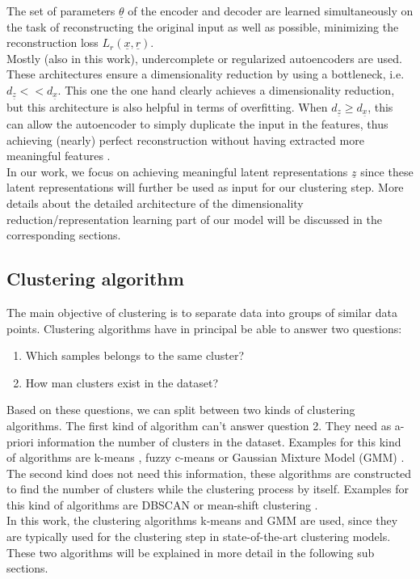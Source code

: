 \documentclass[12pt,DIV14,BCOR12mm,a4paper,footexclude,headinclude,halfparskip-,twoside,openright,cleardoubleempty,idxtotoc,bibtotoc,listtotoc]{scrreprt} %
\numberwithin{equation}{chapter}
\begin{document}
The set of parameters $\underline{\theta}$ of the encoder and decoder are learned simultaneously on the task of reconstructing the original input as well as possible, minimizing the reconstruction loss $L_{r}(\underline{x},\underline{r})$.\\
Mostly (also in this work), undercomplete or regularized autoencoders are used. These architectures ensure a dimensionality reduction by using a bottleneck, i.e. $d_{\underline{z}} << d_{\underline{x}}$. This one the one hand clearly achieves a dimensionality reduction, but this architecture is also helpful in terms of overfitting. When $d_{\underline{z}} \geq d_{\underline{x}}$, this can allow the autoencoder to simply duplicate the input in the features, thus achieving (nearly) perfect reconstruction without having extracted more meaningful features \cite{Bengio-et-al-2013}.\\
In our work, we focus on achieving meaningful latent representations $\underline{z}$ since these latent representations will further be used as input for our clustering step. More details about the detailed architecture of the dimensionality reduction/representation learning part of our model will be discussed in the corresponding sections.
\subsection{Clustering algorithm}
The main objective of clustering is to separate data into groups of similar data points. Clustering algorithms have in principal be able to answer two questions:
\begin{enumerate}
	\item Which samples belongs to the same cluster?
	\item How man clusters exist in the dataset?
\end{enumerate}
Based on these questions, we can split between two kinds of clustering algorithms. The first kind of algorithm can't answer question 2. They need as a-priori information the number of clusters in the dataset. Examples for this kind of algorithms are k-means \cite{Lloyd82leastsquares}, fuzzy c-means \cite{Bezdek81fuzzycmenas} or Gaussian Mixture Model (GMM) \cite{Gilles07MixtureModelsforClassification}.\\
The second kind does not need this information, these algorithms are constructed to find the number of clusters while the clustering process by itself. Examples for this kind of algorithms are DBSCAN \cite{Ester96adensity-based} or mean-shift clustering \cite{Fukunaga75mean-shift}.\\
In this work, the clustering algorithms k-means and GMM are used, since they are typically used for the clustering step in state-of-the-art clustering models. These two algorithms will be explained in more detail in the following sub sections.
\end{document}
